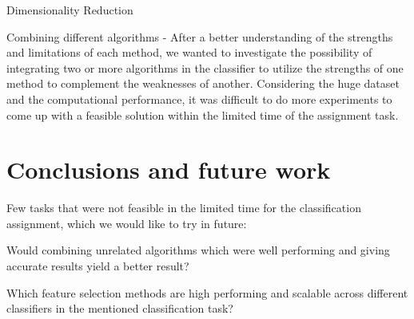 \documentclass[letterpaper,10pt]{article}
\theoremstyle{mytheor}
\begin{document}
Dimensionality Reduction


Combining different algorithms - After a better understanding of the strengths and limitations of each method, we wanted to investigate the possibility of integrating two or more algorithms in the classifier to utilize the strengths of one method to complement the weaknesses of another. Considering the huge dataset and the computational performance, it was difficult to do more experiments to come up with a feasible solution within the limited time of the assignment task.


\section{Conclusions and future work}

Few tasks that were not feasible in the limited time for the classification assignment, which we would like to try in future:

Would combining unrelated algorithms which were well performing and giving accurate results yield a better result?

Which feature selection methods are high performing and scalable across different classifiers in the mentioned classification task? 


\nocite{wiki:fscore}
\nocite{wiki:pandr}
\nocite{wiki:stat} 
\nocite{wiki:curse}


\end{document}
